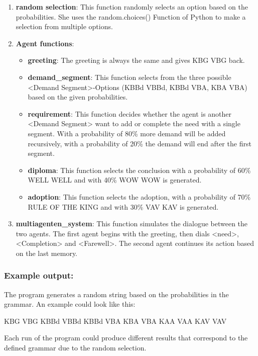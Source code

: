 \documentclass[
]{article}
\begin{document}
\begin{enumerate}
\def\labelenumi{\arabic{enumi}.}
\item
  \textbf{random selection}: This function randomly selects an option
  based on the probabilities. She uses the random.choices() Function of
  Python to make a selection from multiple options.
\item
  \textbf{Agent functions}:

  \begin{itemize}
  \item
    \textbf{greeting}: The greeting is always the same and gives KBG VBG
    back.
  \item
    \textbf{demand\_segment}: This function selects from the three
    possible \textless Demand Segment\textgreater-Options (KBBd VBBd,
    KBBd VBA, KBA VBA) based on the given probabilities.
  \item
    \textbf{requirement}: This function decides whether the agent is
    another \textless Demand Segment\textgreater{} want to add or
    complete the need with a single segment. With a probability of 80\%
    more demand will be added recursively, with a probability of 20\%
    the demand will end after the first segment.
  \item
    \textbf{diploma}: This function selects the conclusion with a
    probability of 60\% WELL WELL and with 40\% WOW WOW is generated.
  \item
    \textbf{adoption}: This function selects the adoption, with a
    probability of 70\% RULE OF THE KING and with 30\% VAV KAV is
    generated.
  \end{itemize}
\item
  \textbf{multiagenten\_system}: This function simulates the dialogue
  between the two agents. The first agent begins with the greeting, then
  dials \textless need\textgreater, \textless Completion\textgreater{}
  and \textless Farewell\textgreater. The second agent continues its
  action based on the last memory.
\end{enumerate}

\subsubsection{\texorpdfstring{\textbf{Example
output:}}{Example output:}}\label{example-output-2}

The program generates a random string based on the probabilities in the
grammar. An example could look like this:

KBG VBG KBBd VBBd KBBd VBA KBA VBA KAA VAA KAV VAV

Each run of the program could produce different results that correspond
to the defined grammar due to the random selection.
\end{document}
